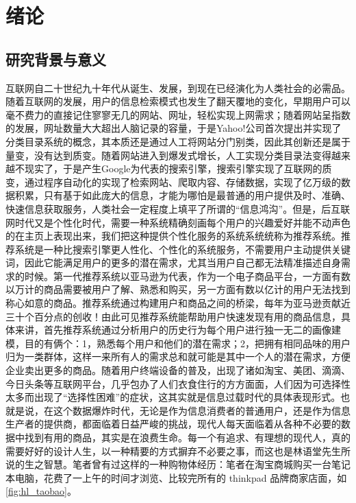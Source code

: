 ﻿
\chapter{绪论}
\label{chap:introduction}
\section{研究背景与意义}
	互联网自二十世纪九十年代从诞生、发展，到现在已经演化为人类社会的必需品。随着互联网的发展，用户的信息检索模式也发生了翻天覆地的变化，早期用户可以毫不费力的直接记住寥寥无几的网站、网址，轻松实现上网需求；随着网站呈指数的发展，网址数量大大超出人脑记录的容量，于是Yahoo!公司首次提出并实现了分类目录系统的概念，其本质还是通过人工将网站分门别类，因此其创新还是属于量变，没有达到质变。随着网站进入到爆发式增长，人工实现分类目录法变得越来越不现实了，于是产生Google为代表的搜索引擎，搜索引擎实现了互联网的质变，通过程序自动化的实现了检索网站、爬取内容、存储数据，实现了亿万级的数据积累，只有基于如此庞大的信息，才能为哪怕是最普通的用户提供及时、准确、快速信息获取服务，人类社会一定程度上填平了所谓的“信息鸿沟”。但是，后互联网时代又是个性化时代\citep{Personalization1,Personalization2,Personalization3,Personalization4,Personalization5,Personalization6,Personalization7,Personalization8,Personalization9}，需要一种系统精确刻画每个用户的兴趣爱好并能不动声色的在主页上表现出来，我们把这种提供个性化服务的系统系统统称为推荐系统。推荐系统是一种比搜索引擎更人性化、个性化的系统服务，不需要用户主动提供关键词，因此它能满足用户的更多的潜在需求，尤其当用户自己都无法精准描述自身需求的时候\citep{recmd-system}。第一代推荐系统以亚马逊为代表，作为一个电子商品平台，一方面有数以万计的商品需要被用户了解、熟悉和购买，另一方面有数以亿计的用户无法找到称心如意的商品。推荐系统通过构建用户和商品之间的桥梁，每年为亚马逊贡献近三十个百分点的创收！由此可见推荐系统能帮助用户快速发现有用的商品信息，具体来讲，首先推荐系统通过分析用户的历史行为每个用户进行独一无二的画像建模\citep{demo-data}，目的有俩个：1，熟悉每个用户和他们的潜在需求；2，把拥有相同品味的用户归为一类群体，这样一来所有人的需求总和就可能是其中一个人的潜在需求，方便企业卖出更多的商品。随着用户终端设备的普及，出现了诸如淘宝、美团、滴滴、今日头条等互联网平台，几乎包办了人们衣食住行的方方面面，人们因为可选择性太多而出现了“选择性困难”的症状，这其实就是信息过载时代的具体表现形式。也就是说，在这个数据爆炸时代，无论是作为信息消费者的普通用户，还是作为信息生产者的提供商，都面临着日益严峻的挑战，现代人每天面临着从各种不必要的数据中找到有用的商品，其实是在浪费生命。每一个有追求、有理想的现代人，真的需要好好的设计人生，以一种精要的方式摒弃不必要之事，而这也是林语堂先生所说的生之智慧。笔者曾有过这样的一种购物体经历：笔者在淘宝商城购买一台笔记本电脑，花费了一上午的时间才浏览、比较完所有的 thinkpad 品牌商家店面，如\autoref{fig:hl_taobao}。
